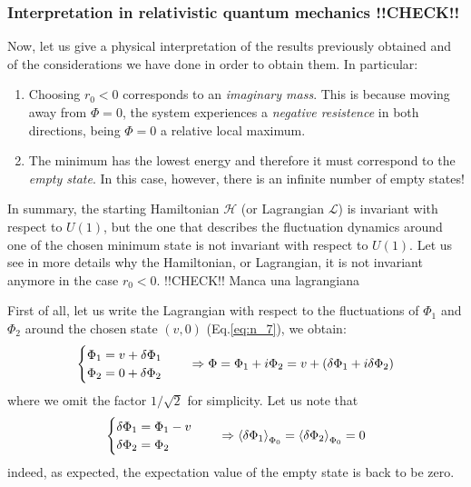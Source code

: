 \documentclass[../../Main/Main.tex]{subfiles}
\begin{document}
\subsubsection{Interpretation in relativistic quantum mechanics !!CHECK!!}

Now, let us give a physical interpretation of the results previously obtained and of the considerations we have done in order to obtain them. In particular:

\begin{enumerate}
\item Choosing \( r_0 <0 \) corresponds to an \emph{imaginary mass}. This is because moving away from \( \Phi =0 \), the system experiences a \emph{negative resistence} in both directions, being \( \Phi =0 \) a relative local maximum.

\item The minimum has the lowest energy and therefore it must correspond to the \emph{empty state}.
In this case, however, there is an infinite number of empty states!

\end{enumerate}

In summary, the starting Hamiltonian \( \mathcal{H} \) (or Lagrangian \( \mathcal{L} \)) is invariant with respect to \( U(1) \), but the one that describes the fluctuation dynamics around one of the chosen minimum state is not invariant with respect to \( U(1) \). Let us see in more details why the Hamiltonian, or Lagrangian, it is not invariant anymore in the case \( r_0 <0 \). !!CHECK!! Manca una lagrangiana

First of all, let us write the Lagrangian with respect to the fluctuations of \( \Phi _1  \)  and \( \Phi _2 \) around the chosen state \( (v,0) \) (Eq.\eqref{eq:n_7}), we obtain:
\begin{equation*}
  \begin{cases}
   \Phi _1 = v + \delta \Phi _1\\
   \Phi _2 = 0 + \delta \Phi _2
  \end{cases}
  \quad \Rightarrow \Phi = \Phi _1 + i\Phi _2 = v + \qty(\delta \Phi _1 + i \delta \Phi _2)
\end{equation*}
where we omit the factor \( 1/\sqrt{2}  \) for simplicity. Let us note that
\begin{equation*}
  \begin{cases}
   \delta \Phi _1 = \Phi _1 - v\\
   \delta \Phi _2 = \Phi _2
  \end{cases}
  \quad \Rightarrow
  \expval{\delta \Phi _1} _{\Phi _0 } = \expval{\delta \Phi _2}_{\Phi _0} = 0
\end{equation*}
indeed, as expected, the expectation value of the empty state is back to be zero.
\end{document}
